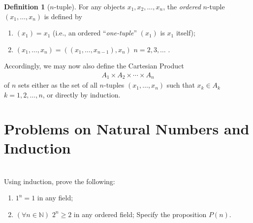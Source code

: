 \documentclass[12pt]{book}
\newcommand{\N}{\mathbb{N}}
\theoremstyle{definition}
\newtheorem{definition}{Definition}[section]
\begin{document}
 \begin{definition}[$n$-tuple]
 	For any objects $x_1,x_2, \ldots, x_n$, the \textit{ordered} $n$-tuple $(x_1, \ldots, x_n)$ is defined by
 \begin{enumerate}[label=(\roman*)]
 	\item $(x_1) = x_1$ (i.e., an ordered ``\textit{one-tuple}'' $(x_1)$ is $x_1$ itself);
 	\item $(x_1, \ldots, x_n) = ((x_1, \ldots, x_{n-1}), x_n) $ $n =2,3,\ldots$ .
 \end{enumerate}
 Accordingly, we may now also define the Cartesian Product
 \begin{align*}
 	A_1 \times A_2 \times \cdots \times A_n	
 \end{align*}
 of $n$ sets either as the set of all $n$-tuples $(x_1, \ldots, x_n)$ such that $x_k \in A_k$ $k=1,2, \ldots, n$, or directly by induction. 
\end{definition}
  

\section{Problems on Natural Numbers and Induction}

\begin{ex}[1]
\\
Using induction, prove the following:
\begin{enumerate}[label= (\roman*)]
	\item $1^n=1$ in any field;
	\item $(\forall n \in \N)$ $2^n\geq 2$ in any ordered field; Specify the proposition $P(n)$. 
\end{enumerate} 
\end{ex}
\end{document}
